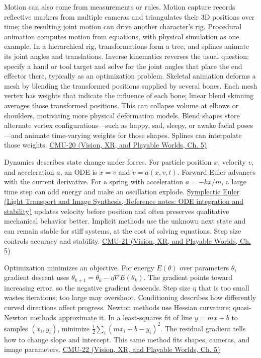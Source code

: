 Motion can also come from measurements or rules. Motion capture records reflective markers from multiple cameras and triangulates their 3D positions over time; the resulting joint motion can drive another character's rig. Procedural animation computes motion from equations, with physical simulation as one example. In a hierarchical rig, transformations form a tree, and splines animate its joint angles and translations. Inverse kinematics reverses the usual question: specify a hand or tool target and solve for the joint angles that place the end effector there, typically as an optimization problem. Skeletal animation deforms a mesh by blending the transformed positions supplied by several bones. Each mesh vertex has weights that indicate the influence of each bone; linear blend skinning averages those transformed positions. This can collapse volume at elbows or shoulders, motivating more physical deformation models. Blend shapes store alternate vertex configurations---such as happy, sad, sleepy, or awake facial poses---and animate time-varying weights for those shapes. Splines can interpolate those weights. \href{../07-Vision-XR-and-Playable-Worlds/main.pdf\#nameddest=04-visual-computing-ii-ch036-cmu-20---introduction-to-animation}{CMU-20 (Vision, XR, and Playable Worlds, Ch. 5)}

Dynamics describes state change under forces. For particle position \(x\), velocity \(v\), and acceleration \(a\), an ODE is \(\dot x=v\) and \(\dot v=a(x,v,t)\). Forward Euler advances with the current derivative. For a spring with acceleration \(a=-kx/m\), a large time step can add energy and make an oscillation explode. \href{../04-Light-Transport-and-Image-Synthesis/main.pdf\#nameddest=appendix-18eacf61a04b}{Symplectic Euler (Light Transport and Image Synthesis, Reference notes: ODE integration and stability)} updates velocity before position and often preserves qualitative mechanical behavior better. Implicit methods use the unknown next state and can remain stable for stiff systems, at the cost of solving equations. Step size controls accuracy and stability. \href{../07-Vision-XR-and-Playable-Worlds/main.pdf\#nameddest=04-visual-computing-ii-ch036-cmu-21---dynamics-and-time-integration}{CMU-21 (Vision, XR, and Playable Worlds, Ch. 5)}

Optimization minimizes an objective. For energy \(E(\theta)\) over parameters \(\theta\), gradient descent uses \(\theta_{k+1}=\theta_k-\eta\nabla E(\theta_k)\). The gradient points toward increasing error, so the negative gradient descends. Step size \(\eta\) that is too small wastes iterations; too large may overshoot. Conditioning describes how differently curved directions affect progress. Newton methods use Hessian curvature; quasi-Newton methods approximate it. In a least-squares fit of line \(y=mx+b\) to samples \((x_i,y_i)\), minimize \(\tfrac12\sum_i(mx_i+b-y_i)^2\). The residual gradient tells how to change slope and intercept. This same method fits shapes, cameras, and image parameters. \href{../07-Vision-XR-and-Playable-Worlds/main.pdf\#nameddest=04-visual-computing-ii-ch036-cmu-22---optimization}{CMU-22 (Vision, XR, and Playable Worlds, Ch. 5)}


